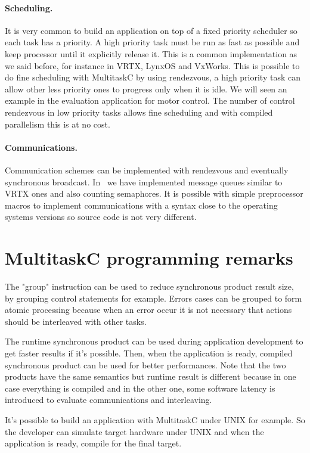 \documentclass[10pt]{report}
\begin{document}
\paragraph{Scheduling.} It is very common to build an application on top of a fixed priority scheduler
so each task has a priority. A high priority task must be run as fast as possible and keep processor
until it explicitly release it. This is a common implementation as we said before, for instance in VRTX,
LynxOS and VxWorks. This is possible to do fine scheduling with MultitaskC by using rendezvous, a high
priority task can allow other less priority ones to progress only when it is idle. We will seen an
example in the evaluation application for motor control. The number of control rendezvous in low priority
tasks allows fine scheduling and with compiled parallelism this is at no cost.

\paragraph{Communications.} Communication schemes can be implemented with rendezvous and eventually
synchronous broadcast. In~\cite{Delchini:95} we have implemented message queues similar to VRTX ones
and also counting semaphores. It is possible with simple preprocessor macros to implement communications
with a syntax close to the operating systems versions so source code is not very different.

\section{MultitaskC programming remarks}

The "group" instruction can be used to reduce synchronous product result size, by grouping control
statements for example. Errors cases can be grouped to form atomic processing because when an error
occur it is not necessary that actions should be interleaved with other tasks.

The runtime synchronous product can be used during application development to get faster results
if it's possible. Then, when the application is ready, compiled synchronous product can be used for
better performances. Note that the two products have the same semantics but runtime result is
different because in one case everything is compiled and in the other one, some software latency
is introduced to evaluate communications and interleaving.

It's possible to build an application with MultitaskC under UNIX for example. So the developer can simulate
target hardware under UNIX and when the application is ready, compile for the final target.
\end{document}

